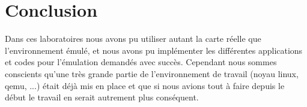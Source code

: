 
\chapter{Conclusion} %

\label{Conclusion} %


Dans ces laboratoires nous avons pu utiliser autant la carte réelle que l'environnement émulé, et nous avons pu implémenter les différentes applications et codes pour l'émulation demandés avec succès. Cependant nous sommes conscients qu'une très grande partie de l'environnement de travail (noyau linux, qemu, ...) était déjà mis en place et que si nous avions tout à faire depuis le début le travail en serait autrement plus conséquent.